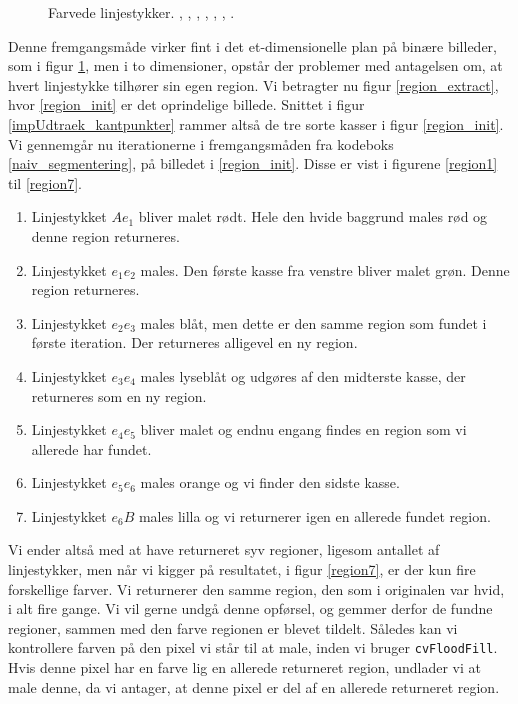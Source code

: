 {\begin{figure}[!h]
\begin{picture}
    \end{picture}
    \caption[]{Farvede linjestykker. ,
    , ,
    , ,
    , .
    }
    \label{impUdtraek_naiv_res}
\end{figure}
Denne fremgangsmåde virker fint i det et-dimensionelle plan på binære
billeder, som i figur \ref{impUdtraek_naiv_res}, men i to dimensioner,
opstår der problemer med antagelsen om, at hvert linjestykke tilhører
sin egen region. Vi betragter nu figur \ref{region_extract}, hvor
\ref{region_init} er det oprindelige billede.  Snittet i figur
\ref{impUdtraek_kantpunkter} rammer altså de tre sorte kasser i figur
\ref{region_init}. Vi gennemgår nu iterationerne i fremgangsmåden fra
kodeboks \ref{naiv_segmentering}, på billedet i \ref{region_init}.
Disse er vist i figurene \ref{region1} til \ref{region7}.

\begin{enumerate}
    \item Linjestykket $Ae_1$ bliver malet rødt. Hele den hvide baggrund
        males rød og denne region returneres.
    \item Linjestykket $e_1e_2$ males. Den første kasse fra venstre
        bliver malet grøn. Denne region returneres.
    \item Linjestykket $e_2e_3$ males blåt, men dette er den samme region som
        fundet i første iteration. Der returneres alligevel en ny
        region.
    \item Linjestykket $e_3e_4$ males lyseblåt og udgøres af den
        midterste kasse, der returneres som en ny region.
    \item Linjestykket $e_4e_5$ bliver malet og endnu engang findes en
        region som vi allerede har fundet.
    \item Linjestykket $e_5e_6$ males orange og vi finder den sidste
        kasse.
    \item Linjestykket $e_6B$ males lilla og vi returnerer igen en
        allerede fundet region.
\end{enumerate}
Vi ender altså med at have returneret syv regioner, ligesom antallet af
linjestykker, men når vi kigger på resultatet, i figur \ref{region7}, er
der kun fire forskellige farver. Vi returnerer den samme region, den som
i originalen var hvid, i alt fire gange. Vi vil gerne undgå denne
opførsel, og gemmer derfor de fundne regioner, sammen med den farve
regionen er blevet tildelt. Således kan vi kontrollere farven på den
pixel vi står til at male, inden vi bruger \texttt{cvFloodFill}. Hvis
denne pixel har en farve lig en allerede returneret region, undlader vi
at male denne, da vi antager, at denne pixel er del af en allerede
returneret region.

}
